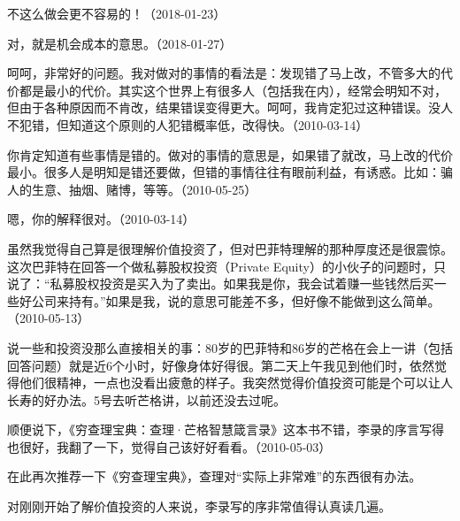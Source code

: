 
不这么做会更不容易的！（2018-01-23）


对，就是机会成本的意思。（2018-01-27）


呵呵，非常好的问题。我对做对的事情的看法是：发现错了马上改，不管多大的代价都是最小的代价。其实这个世界上有很多人（包括我在内），经常会明知不对，但由于各种原因而不肯改，结果错误变得更大。呵呵，我肯定犯过这种错误。没人不犯错，但知道这个原则的人犯错概率低，改得快。（2010-03-14）


你肯定知道有些事情是错的。做对的事情的意思是，如果错了就改，马上改的代价最小。很多人是明知是错还要做，但错的事情往往有眼前利益，有诱惑。比如：骗人的生意、抽烟、赌博，等等。（2010-05-25）


嗯，你的解释很对。（2010-03-14）


虽然我觉得自己算是很理解价值投资了，但对巴菲特理解的那种厚度还是很震惊。这次巴菲特在回答一个做私募股权投资（Private Equity）的小伙子的问题时，只说了：“私募股权投资是买入为了卖出。如果我是你，我会试着赚一些钱然后买一些好公司来持有。”如果是我，说的意思可能差不多，但好像不能做到这么简单。（2010-05-13）

说一些和投资没那么直接相关的事：80岁的巴菲特和86岁的芒格在会上一讲（包括回答问题）就是近6个小时，好像身体好得很。第二天上午我见到他们时，依然觉得他们很精神，一点也没看出疲惫的样子。我突然觉得价值投资可能是个可以让人长寿的好办法。5号去听芒格讲，以前还没去过呢。

顺便说下，《穷查理宝典：查理·芒格智慧箴言录》这本书不错，李录的序言写得也很好，我翻了一下，觉得自己该好好看看。（2010-05-03）

在此再次推荐一下《穷查理宝典》，查理对“实际上非常难”的东西很有办法。

对刚刚开始了解价值投资的人来说，李录写的序非常值得认真读几遍。

